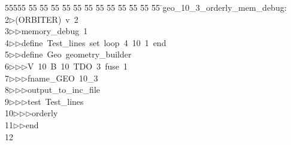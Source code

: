 %
%
\begin{tabbing}
55555 \= 55 \= 55 \= 55 \= 55 \= 55 \= 55 \= 55 \= 55 \= 55 \= 55 \= 55 \= 55 \= \>geo\_10\_3\_orderly\_mem\_debug:\\[0pt]
2\>$\triangleright$\>(ORBITER)\ v\ 2\ \\[0pt]
3\>$\triangleright$\>$\triangleright$\>memory\_debug\ 1\ \\[0pt]
4\>$\triangleright$\>$\triangleright$\>define\ Test\_lines\ set\ loop\ 4\ 10\ 1\ end\ \\[0pt]
5\>$\triangleright$\>$\triangleright$\>define\ Geo\ geometry\_builder\ \\[0pt]
6\>$\triangleright$\>$\triangleright$\>$\triangleright$\>V\ 10\ B\ 10\ TDO\ 3\ fuse\ 1\ \\[0pt]
7\>$\triangleright$\>$\triangleright$\>$\triangleright$\>fname\_GEO\ 10\_3\ \\[0pt]
8\>$\triangleright$\>$\triangleright$\>$\triangleright$\>output\_to\_inc\_file\ \\[0pt]
9\>$\triangleright$\>$\triangleright$\>$\triangleright$\>test\ Test\_lines\ \\[0pt]
10\>$\triangleright$\>$\triangleright$\>$\triangleright$\>orderly\ \\[0pt]
11\>$\triangleright$\>$\triangleright$\>end\\[0pt]
12\>\end{tabbing}
